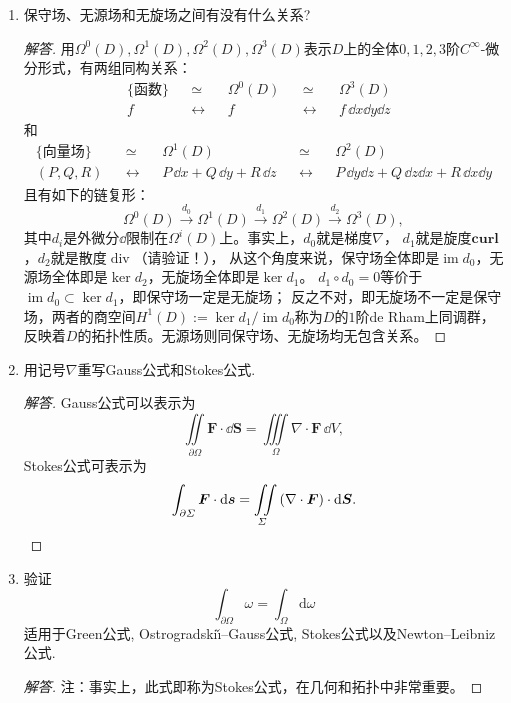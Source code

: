 \begin{quiza}
\begin{enumerate}
\item 保守场、无源场和无旋场之间有没有什么关系?
\begin{proof}[解答]
用$\Omega^0(D),\Omega^1(D),\Omega^2(D),\Omega^3(D)$表示$D$上的全体$0,1,2,3$阶$C^\infty$-微分形式，有两组同构关系：
\begin{align*}\{函数\}& &\simeq& &\Omega^0(D)& &\simeq& &\Omega^3(D)\ \ \ \\
f\quad & & \leftrightarrow & & f\quad & & \leftrightarrow & & f\,\dd x\dd y\dd z\end{align*}
和\begin{align*}\{向量场\}\,& &\simeq& &\Omega^1(D)\qquad\ \ \ & &\simeq& &\Omega^2(D)\qquad\qquad\ \ \\
(P,Q,R) & & \leftrightarrow & & P\,\dd x+Q\,\dd y+R\,\dd z & & \leftrightarrow & & P\,\dd y\dd z+Q\,\dd z\dd x+R\,\dd x\dd y\end{align*}
且有如下的链复形：
\[\Omega^0(D)\stackrel{d_0}{\longrightarrow}\Omega^1(D)
\stackrel{d_1}{\longrightarrow}\Omega^2(D)\stackrel{d_2}{\longrightarrow}\Omega^3(D),\]
其中$d_i$是外微分$\dd$限制在$\Omega^i(D)$上。事实上，$d_0$就是梯度$\nabla$，
$d_1$就是旋度$\textbf{curl}$，$d_2$就是散度$\operatorname{div}$（请验证！），
从这个角度来说，保守场全体即是$\operatorname{im}d_0$，无源场全体即是$\ker d_2$，无旋场全体即是$\ker d_1$。
$d_1 \circ d_0=0$等价于$\operatorname{im}d_0\subset\ker d_1$，即保守场一定是无旋场；
反之不对，即无旋场不一定是保守场，两者的商空间$H^1(D):=\ker d_1/\operatorname{im}d_0$称为$D$的$1$阶de Rham上同调群，
反映着$D$的拓扑性质。无源场则同保守场、无旋场均无包含关系。
\end{proof}

\item 用记号\(\nabla\)重写Gauss公式和Stokes公式.
\begin{proof}[解答]
Gauss公式可以表示为\[\iint\limits_{\partial \varOmega}\boldsymbol{F}\cdot\dd\boldsymbol{S}
=\iiint\limits_{\varOmega}\nabla\cdot\boldsymbol{F}\,\dd V,\]Stokes公式可表示为
\[\int_{\partial\varSigma}\boldsymbol{F}\cdot\mathrm{d}\boldsymbol{s}
=\iint\limits_{\varSigma}\left(\nabla\cdot\boldsymbol{F}\right)\cdot\mathrm{d}\boldsymbol{S}.\qedhere\]
\end{proof}

\item 验证\[\int_{\partial\varOmega}\omega=\int_{\varOmega}\mathrm{d}\omega\]
适用于Green公式, Ostrogradski\v{\i}--Gauss公式, Stokes公式以及Newton--Leibniz公式.
\begin{proof}[解答]

注：事实上，此式即称为Stokes公式，在几何和拓扑中非常重要。
\end{proof}


\end{enumerate}
\end{quiza}
